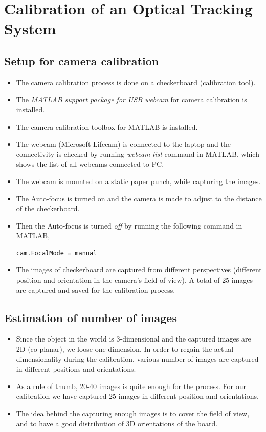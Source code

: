 \documentclass[11pt,a4paper]{article}
\begin{document}
				\section{Calibration of an Optical Tracking System}
				\subsection{Setup for camera calibration }
				\begin{itemize}
					\item The camera calibration process is done on a checkerboard (calibration tool).
					\item The \textit{MATLAB support package for USB webcam} for camera calibration is installed.
					\item The camera calibration toolbox for MATLAB is installed.
					\item The webcam (Microsoft Lifecam) is connected to the laptop and the connectivity is checked by running \textit{webcam list} command in MATLAB, which shows the list of all webcams connected to PC.
					\item The webcam is mounted on a static paper punch, while capturing the images.
					\item The Auto-focus is turned on and the camera is made to adjust to the distance of the checkerboard.
					\item Then the Auto-focus is turned \textit{off} by running the following command in MATLAB,
					\begin{lstlisting}
cam.FocalMode = manual
					\end{lstlisting}
					\item The images of checkerboard are captured from different perspectives (different position and orientation in the camera's field of view). A total of 25 images are captured and saved for the calibration process.
				\end{itemize}
				
				\subsection{Estimation of number of images}
				\begin{itemize}
					\item Since the object in the world is 3-dimensional and the captured images are 2D (co-planar), we loose one dimension. In order to regain the actual dimensionality during the calibration, various number of images are captured in different positions and orientations. 
					\item As a rule of thumb, 20-40 images is quite enough for the process. For our calibration we have captured 25 images in different position and orientations. 
					\item The idea behind the capturing enough images is to cover the field of view, and to have a good distribution of 3D orientations of the board. 
				\end{itemize}
				
\end{document}
